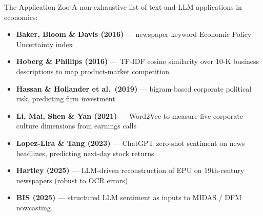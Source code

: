 \documentclass[10pt,english,aspectratio=169]{beamer}
\begin{document}
\begin{frame}{The Application Zoo}
A non-exhaustive list of text-and-LLM applications in economics:

\medskip
\begin{itemize}
\item \textbf{Baker, Bloom \& Davis (2016)} --- newspaper-keyword Economic Policy Uncertainty index
\medskip
\item \textbf{Hoberg \& Phillips (2016)} --- TF-IDF cosine similarity over 10-K business descriptions to map product-market competition
\medskip
\item \textbf{Hassan \& Hollander et al.\ (2019)} --- bigram-based corporate political risk, predicting firm investment
\medskip
\item \textbf{Li, Mai, Shen \& Yan (2021)} --- Word2Vec to measure five corporate culture dimensions from earnings calls
\medskip
\item \textbf{Lopez-Lira \& Tang (2023)} --- ChatGPT zero-shot sentiment on news headlines, predicting next-day stock returns
\medskip
\item \textbf{Hartley (2025)} --- LLM-driven reconstruction of EPU on 19th-century newspapers (robust to OCR errors)
\medskip
\item \textbf{BIS (2025)} --- structured LLM sentiment as inputs to MIDAS / DFM nowcasting
\end{itemize}
\end{frame}
\end{document}
